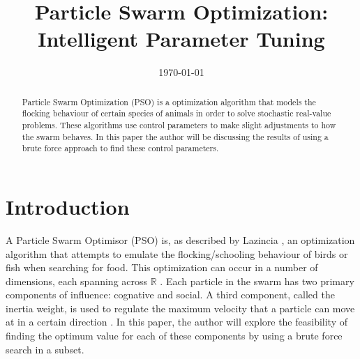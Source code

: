 \documentclass[hidelinks,english,conference]{IEEEtran}
\date{\today}
\begin{document}
\title{Particle Swarm Optimization: Intelligent Parameter Tuning}
\author{
}
\maketitle

\begin{abstract}
Particle Swarm Optimization (PSO) is a optimization algorithm that models the flocking behaviour of certain species of animals in order to solve stochastic real-value problems. These algorithms use control parameters to make slight adjustments to how the swarm behaves. In this paper the author will be discussing the results of using a brute force approach to find these control parameters.
\end{abstract}

\IEEEpeerreviewmaketitle

\section{Introduction}\label{intoductionSection}
A Particle Swarm Optimisor (PSO) is, as described by Lazincia \cite{lazinica2009particle}, an optimization algorithm that attempts to emulate the flocking/schooling behaviour of birds or fish when searching for food. This optimization can occur in a number of dimensions, each spanning across $\mathbb{R}$ \cite{kennedy1997discrete}. Each particle in the swarm has two primary components of influence: cognative and social. A third component, called the inertia weight, is used to regulate the maximum velocity that a particle can move at in a certain direction \cite{eberhart2000comparing}. In this paper, the author will explore the feasibility of finding the optimum value for each of these components by using a brute force search in a subset.
\end{document}
